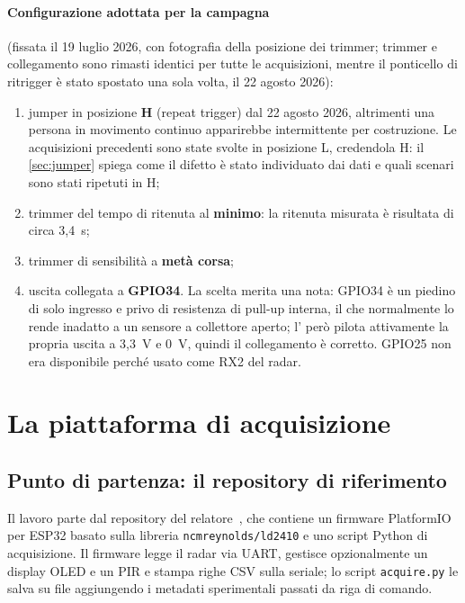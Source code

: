 \paragraph{Configurazione adottata per la campagna} (fissata il 19 luglio 2026, con
fotografia della posizione dei trimmer; trimmer e collegamento sono rimasti identici
per tutte le acquisizioni, mentre il ponticello di ritrigger è stato spostato una
sola volta, il 22 agosto 2026):

\begin{enumerate}[leftmargin=1.8em,itemsep=2pt]
  \item jumper in posizione \textbf{H} (repeat trigger) dal 22 agosto 2026, altrimenti
        una persona in movimento continuo apparirebbe intermittente per costruzione.
        Le acquisizioni precedenti sono state svolte in posizione L, credendola H: il
        \cref{sec:jumper} spiega come il difetto è stato individuato dai dati e quali
        scenari sono stati ripetuti in H;
  \item trimmer del tempo di ritenuta al \textbf{minimo}: la ritenuta misurata è
        risultata di circa 3,4~s;
  \item trimmer di sensibilità a \textbf{metà corsa};
  \item uscita collegata a \textbf{GPIO34}. La scelta merita una nota: GPIO34 è un
        piedino di solo ingresso e privo di resistenza di pull-up interna, il che
        normalmente lo rende inadatto a un sensore a collettore aperto;
        l'\pir{} però pilota attivamente la propria uscita a 3,3~V e 0~V, quindi il
        collegamento è corretto. GPIO25 non era disponibile perché usato come RX2
        del radar.
\end{enumerate}

\section{La piattaforma di acquisizione}
\label{sec:piattaforma}
\label{sec:formato-dati}

\subsection{Punto di partenza: il repository di riferimento}

Il lavoro parte dal repository del relatore~\cite{repoCallisto}, che contiene un
firmware PlatformIO per ESP32 basato sulla libreria \texttt{ncmreynolds/ld2410} e
uno script Python di acquisizione. Il firmware legge il radar via UART, gestisce
opzionalmente un display OLED e un PIR e stampa righe CSV sulla seriale; lo script
\texttt{acquire.py} le salva su file aggiungendo i metadati sperimentali passati
da riga di comando.

